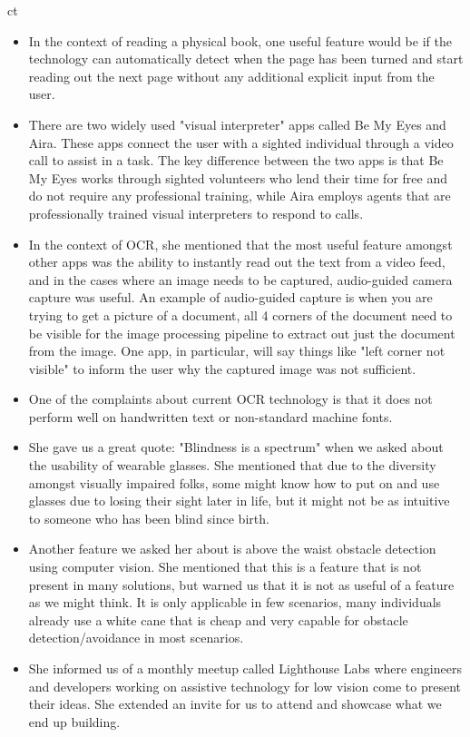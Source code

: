 ct\documentclass[a4paper,11pt]{article}
\begin{document}
\begin{itemize}
    \item In the context of reading a physical book, one useful feature would be if the technology can automatically detect when the page has been turned and start reading out the next page without any additional explicit input from the user.
    \item There are two widely used "visual interpreter" apps called Be My Eyes and Aira. These apps connect the user with a sighted individual through a video call to assist in a task. The key difference between the two apps is that Be My Eyes works through sighted volunteers who lend their time for free and do not require any professional training, while Aira employs agents that are professionally trained visual interpreters to respond to calls.
    \item In the context of OCR, she mentioned that the most useful feature amongst other apps was the ability to instantly read out the text from a video feed, and in the cases where an image needs to be captured, audio-guided camera capture was useful. An example of audio-guided capture is when you are trying to get a picture of a document, all 4 corners of the document need to be visible for the image processing pipeline to extract out just the document from the image. One app, in particular, will say things like "left corner not visible" to inform the user why the captured image was not sufficient.
    \item One of the complaints about current OCR technology is that it does not perform well on handwritten text or non-standard machine fonts.
    \item She gave us a great quote: "Blindness is a spectrum" when we asked about the usability of wearable glasses. She mentioned that due to the diversity amongst visually impaired folks, some might know how to put on and use glasses due to losing their sight later in life, but it might not be as intuitive to someone who has been blind since birth.
    \item Another feature we asked her about is above the waist obstacle detection using computer vision. She mentioned that this is a feature that is not present in many solutions, but warned us that it is not as useful of a feature as we might think. It is only applicable in few scenarios, many individuals already use a white cane that is cheap and very capable for obstacle detection/avoidance in most scenarios.
    \item She informed us of a monthly meetup called Lighthouse Labs where engineers and developers working on assistive technology for low vision come to present their ideas. She extended an invite for us to attend and showcase what we end up building.
\end{itemize}
\end{document}
